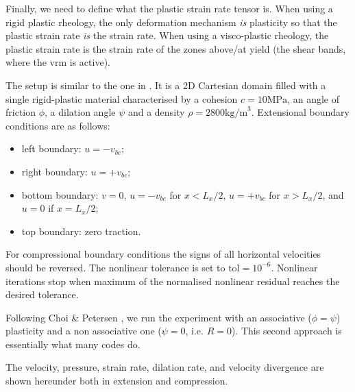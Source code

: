 Finally, we need to define what the plastic strain rate tensor is. When using a rigid plastic 
rheology, the only deformation mechanism {\it is} plasticity so that the plastic strain rate {\it is}
the strain rate. When using a visco-plastic rheology, the plastic strain rate is the strain rate 
of the zones above/at yield (the shear bands, where the vrm is active).
 

The setup is similar to the one in \cite{kaus10}. It is a 2D Cartesian domain filled with a 
single rigid-plastic material characterised by a cohesion $c=10\text{MPa}$, an 
angle of friction $\phi$, a dilation angle $\psi$ and a density $\rho=2800\text{kg/m}^3$.
Extensional boundary conditions are as follows: 
\begin{itemize}
\item left boundary: $u=- v_{bc}$;
\item right boundary: $u=+ v_{bc}$; 
\item bottom boundary: $v=0$, $u=- v_{bc}$ for $x<L_x/2$,  $u=+ v_{bc}$ for $x>L_x/2$, and $u=0$ if $x=L_x/2$;
\item top boundary: zero traction.
\end{itemize}
For compressional boundary conditions the signs of all horizontal velocities should be reversed.
The nonlinear tolerance is set to $\text{tol}=10^{-6}$. Nonlinear iterations stop when 
maximum of the normalised nonlinear residual reaches the desired tolerance.

Following Choi \& Petersen \cite{chpe15}, we run the experiment with an associative ($\phi=\psi$) plasticity
and a non associative one ($\psi=0$, i.e. $R=0$). This second approach is essentially what many codes 
do. 

The velocity, pressure, strain rate, dilation rate, and velocity divergence are shown hereunder both in 
extension and compression.

